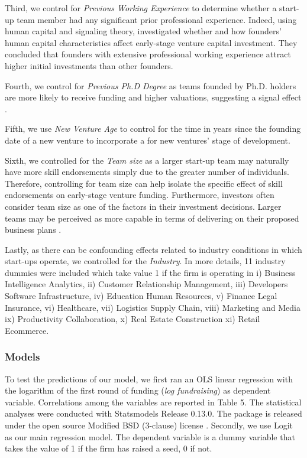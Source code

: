\documentclass[12pt]{article}
\begin{document}
Third, we control for \textit{Previous Working Experience} to determine whether a start-up team member had any significant prior professional experience. Indeed, using human capital and signaling theory, \citet{subramanian2022backing} investigated whether and how founders' human capital characteristics affect early-stage venture capital investment. They concluded that founders with extensive professional working experience attract higher initial investments than other founders.

Fourth, we control for \textit{Previous Ph.D Degree} as teams founded by Ph.D. holders are more likely to receive funding and higher valuations, suggesting a signal effect \citep{hsu2007experienced}.

Fifth, we use \textit{New Venture Age} to control for the time in years since the founding date of a new venture to incorporate a for new ventures' stage of development.

Sixth, we controlled for the \textit{Team size} as a larger start-up team may naturally have more skill endorsements simply due to the greater number of individuals. Therefore, controlling for team size can help isolate the specific effect of skill endorsements on early-stage venture funding. Furthermore, investors often consider team size as one of the factors in their investment decisions. Larger teams may be perceived as more capable in terms of delivering on their proposed business plans \citep{harrison2007s, williamsky1998demographyand}.

Lastly, as there can be confounding effects related to industry conditions in which start-ups operate, we controlled for the \textit{Industry}. In more details, 11 industry dummies were included which take value 1 if the firm is operating in i) Business Intelligence Analytics, ii) Customer Relationship Management, iii) Developers Software Infrastructure, iv) Education Human Resources, v) Finance Legal Insurance, vi) Healthcare, vii) Logistics Supply Chain, viii) Marketing and Media ix) Productivity Collaboration, x) Real Estate Construction xi) Retail Ecommerce.

\subsubsection{Models}

To test the predictions of our model, we first ran an OLS linear regression with the logarithm of the first round of funding (\textit{log fundraising}) as dependent variable. Correlations among the variables are reported in Table 5\label{table5}. The statistical analyses were conducted with Statsmodels Release 0.13.0. The package is released under the open source Modified BSD (3-clause) license \citep{seabold2010statsmodels}. Secondly, we use Logit as our main regression model. The dependent variable is a dummy variable that takes the value of 1 if the firm has raised a seed, 0 if not. \\
\end{document}
